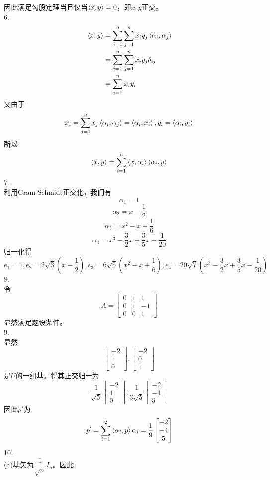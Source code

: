 \documentclass[utf8]{ctexart}
\begin{document}
因此满足勾股定理当且仅当$\braket{x,y}=0$，即$x,y$正交。\\
6.\\
\begin{align*}
	\braket{x,y}&=\sum_{i=1}^n\sum_{j=1}^nx_iy_j\braket{\alpha_i,\alpha_j}\\
	&=\sum_{i=1}^n\sum_{j=1}^nx_iy_j\delta_{ij}\\
	&=\sum_{i=1}^nx_iy_i
\end{align*}
又由于
\[x_i=\sum_{j=1}^nx_j\braket{\alpha_i,\alpha_j}=\braket{\alpha_i,x_i},y_i=\braket{\alpha_i,y_i}\]
所以
\[\braket{x,y}=\sum_{i=1}^n\braket{x,\alpha_i}\braket{\alpha_i,y}\]
7.\\
利用Gram-Schmidt正交化，我们有
\[\alpha_1=1\]
\[\alpha_2=x-\frac{1}{2}\]
\[\alpha_3=x^2-x+\frac{1}{6}\]
\[\alpha_4=x^3-\frac{3}{2}x+\frac{3}{5}x-\frac{1}{20}\]
归一化得
\[e_1=1,e_2=2\sqrt{3}(x-\frac{1}{2}),e_3=6\sqrt{5}(x^2-x+\frac{1}{6}),e_4=20\sqrt{7}(x^3-\frac{3}{2}x+\frac{3}{5}x-\frac{1}{20})\]
8.\\
令
\[A=\begin{bmatrix}
	0&1&1\\
	0&1&-1\\
	0&0&1
\end{bmatrix}\]
显然满足题设条件。\\
9.\\
显然
\[\begin{bmatrix}
	-2\\
	1\\
	0
\end{bmatrix},\begin{bmatrix}
-2\\
0\\
1
\end{bmatrix}\]
是$U$的一组基。将其正交归一为
\[\frac{1}{\sqrt{5}}\begin{bmatrix}
	-2\\
	1\\
	0
\end{bmatrix},\frac{1}{3\sqrt{5}}\begin{bmatrix}
-2\\
-4\\
5
\end{bmatrix}\]
因此$p'$为
\[p'=\sum_{i=1}^2\braket{\alpha_i,p}\alpha_i=\frac{1}{9}\begin{bmatrix}
	-2\\
	-4\\
	5
\end{bmatrix}\]
10.\\
(a)基矢为$\dfrac{1}{\sqrt{n}}I_n$。因此
\end{document}
